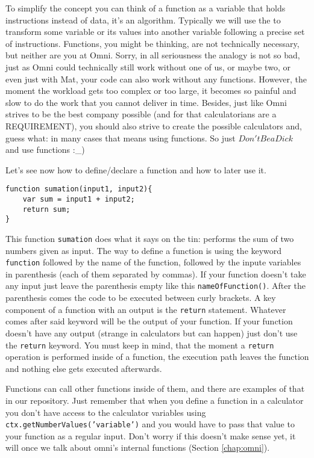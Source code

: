 To simplify the concept you can think of a function as a variable that holds instructions instead of data, it's an algorithm. Typically we will use the to transform some variable or its values into another variable following a precise set of instructions. Functions, you might be thinking, are not technically necessary, but neither are you at Omni. Sorry, in all seriousness the analogy is not so bad, just as Omni could technically still work without one of us, or maybe two, or even just with Mat, your code can also work without any functions. However, the moment the workload gets too complex or too large, it becomes so painful and slow to do the work that you cannot deliver in time. Besides, just like Omni strives to be the best company possible (and for that calculatorians are a REQUIREMENT), you should also strive to create the possible calculators and, guess what: in many cases that means using functions. So just $Don't Be a Dick$\texttrademark \vspace{2pt} and use functions :\_)

Let's see now how to define/declare a function and how to later use it.
\begin{lstlisting}
function sumation(input1, input2){
    var sum = input1 + input2;
    return sum;
}
\end{lstlisting}
This function \texttt{sumation} does what it says on the tin: performs the sum of two numbers given as input. The way to define a function is using the keyword \texttt{function} followed by the name of the function, followed by the inpute variables in parenthesis (each of them separated by commas). If your function doesn't take any input just leave the parenthesis empty like this \texttt{nameOfFunction()}. After the parenthesis comes the code to be executed between curly brackets. A key component of a function with an output is the \texttt{return} statement. Whatever comes after said keyword will be the output of your function. If your function doesn't have any output (strange in calculators but can happen) just don't use the \texttt{return} keyword. You must keep in mind, that the moment a \texttt{return} operation is performed inside of a function, the execution path leaves the function and nothing else gets executed afterwards. 

Functions can call other functions inside of them, and there are examples of that in our repository. Just remember that when you define a function in a calculator you don't have access to the calculator variables using \texttt{ctx.getNumberValues('variable')} and you would have to pass that value to your function as a regular input. Don't worry if this doesn't make sense yet, it will once we talk about omni's internal functions (Section \ref{chap:omni}).

